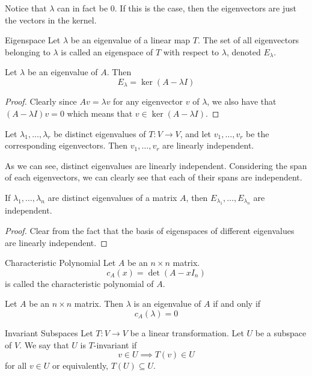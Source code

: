 \documentclass[a4paper]{article}
\begin{document}
Notice that $\lambda$ can in fact be $0$. If this is the case, then the eigenvectors are just the vectors in the kernel. 

\begin{defn}{Eigenspace}{} Let $\lambda$ be an eigenvalue of a linear map $T$. The set of all eigenvectors belonging to $\lambda$ is called an eigenspace of $T$ with respect to $\lambda$, denoted $E_\lambda$. 
\end{defn}

\begin{lmm}{}{} Let $\lambda$ be an eigenvalue of $A$. Then $$E_\lambda=\ker(A-\lambda I)$$ \tcbline
\begin{proof}
Clearly since $Av=\lambda v$ for any eigenvector $v$ of $\lambda$, we also have that $(A-\lambda I)v=0$ which means that $v\in\ker(A-\lambda I)$. 
\end{proof}
\end{lmm}

\begin{prp}{}{} Let $\lambda_1,\dots,\lambda_r$ be distinct eigenvalues of $T:V\to V$, and let $v_1,\dots,v_r$ be the corresponding eigenvectors. Then $v_1,\dots,v_r$ are linearly independent. 
\end{prp}

As we can see, distinct eigenvalues are linearly independent. Considering the span of each eigenvectors, we can clearly see that each of their spans are independent. 

\begin{prp}{}{} If $\lambda_1,\dots,\lambda_n$ are distinct eigenvalues of a matrix $A$, then $E_{\lambda_1},\dots,E_{\lambda_n}$ are independent. \tcbline
\begin{proof}
Clear from the fact that the basis of eigenspaces of different eigenvalues are linearly independent. 
\end{proof}
\end{prp}

\begin{defn}{Characteristic Polynomial}{} Let $A$ be an $n\times n$ matrix. $$c_A(x)=\det(A-xI_n)$$ is called the characteristic polynomial of $A$. 
\end{defn}

\begin{prp}{}{} Let $A$ be an $n\times n$ matrix. Then $\lambda$ is an eigenvalue of $A$ if and only if $$c_A(\lambda)=0$$
\end{prp}

\begin{defn}{Invariant Subspaces}{} Let $T:V\to V$ be a linear transformation. Let $U$ be a subspace of $V$. We say that $U$ is $T$-invariant if $$v\in U\implies T(v)\in U$$ for all $v\in U$ or equivalently, $T(U)\subseteq U$. 
\end{defn}
\end{document}
